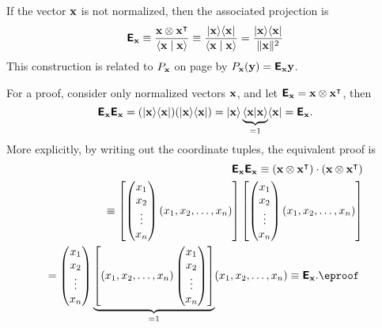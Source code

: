 If the vector ${\bf x}$ is not normalized,
then the associated projection is
\begin{equation}
\textsf{\textbf{E}}_{\bf x} \equiv \frac{{\bf x} \otimes {\bf x}^\intercal }{\langle {\bf x}\mid {\bf x}\rangle}
\equiv \frac{\vert{\bf x}\rangle \langle {\bf x}\vert}{\langle {\bf x}\mid {\bf x}\rangle}
= \frac{\vert{\bf x}\rangle \langle {\bf x}\vert}{\| {\bf x}\|^2}
\end{equation}
This construction is related to
$P_{\bf x}$ on page \pageref{2011-m-gsp}
by $P_{\bf x}({\bf y})=\textsf{\textbf{E}}_{\bf x}{\bf y}$.

{\color{OliveGreen}
\bproof
For a proof,  consider only normalized vectors ${\bf x}$, and
let $\textsf{\textbf{E}}_{\bf x} = {\bf x}\otimes {\bf x}^\intercal  $,
then
$$
\textsf{\textbf{E}}_{\bf x}\textsf{\textbf{E}}_{\bf x}
=
(\vert{\bf x}\rangle \langle {\bf x}\vert)
(\vert{\bf x}\rangle \langle {\bf x}\vert)
=
\vert{\bf x}\rangle \underbrace{\langle {\bf x}\vert {\bf x}\rangle}_{=1} \langle {\bf x}\vert
=  \textsf{\textbf{E}}_{\bf x}.
$$
More explicitly, by writing out the coordinate tuples, the equivalent proof is
\begin{equation}
\begin{split}
\textsf{\textbf{E}}_{\bf x}\textsf{\textbf{E}}_{\bf x}
\equiv ({\bf x}\otimes {\bf x}^\intercal  ) \cdot ({\bf x}\otimes {\bf x}^\intercal  )
\\
\equiv
\left[
\begin{pmatrix}
x_1\\
x_2\\
\vdots \\
x_n
\end{pmatrix}
(x_1,x_2,\ldots ,x_n)
\right]
\left[
\begin{pmatrix}
x_1\\
x_2\\
\vdots \\
x_n
\end{pmatrix}
(x_1,x_2,\ldots ,x_n)
 \right]
\\
=
\begin{pmatrix}
x_1\\
x_2\\
\vdots \\
x_n
\end{pmatrix}
\underbrace{\left[ (x_1,x_2,\ldots ,x_n)
\begin{pmatrix}
x_1\\
x_2\\
\vdots \\
x_n
\end{pmatrix}
\right]}_{=1}
(x_1,x_2,\ldots ,x_n)
\equiv\textsf{\textbf{E}}_{\bf x}. \textrm{\eproof }
\end{split}
\end{equation}
}

